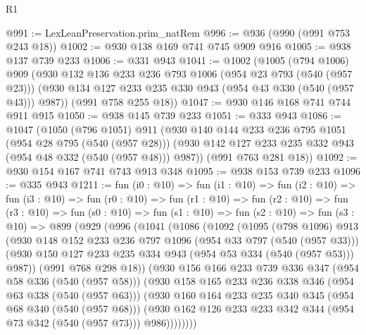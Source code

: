 \begin{lexlean}{R1}
\begin{coremodule}
@991 := LexLeanPreservation.prim_natRem
@996 := @936 (@990 (@991 @753 @243 @18))
@1002 := @930 @138 @169 @741 @745 @909 @916
@1005 := @938 @137 @739 @233
@1006 := @331 @943
@1041 := @1002
    (@1005
      (@794 @1006)
      @909
      (@930
        @132
        @136
        @233
        @236
        @793
        @1006
        (@954 @23 @793 (@540 (@957 @23)))
        (@930 @134 @127 @233 @235 @330 @943 (@954 @43 @330 (@540 (@957 @43))) @987))
      (@991 @758 @255 @18))
@1047 := @930 @146 @168 @741 @744 @911 @915
@1050 := @938 @145 @739 @233
@1051 := @333 @943
@1086 := @1047
    (@1050
      (@796 @1051)
      @911
      (@930
        @140
        @144
        @233
        @236
        @795
        @1051
        (@954 @28 @795 (@540 (@957 @28)))
        (@930 @142 @127 @233 @235 @332 @943 (@954 @48 @332 (@540 (@957 @48))) @987))
      (@991 @763 @281 @18))
@1092 := @930 @154 @167 @741 @743 @913 @348
@1095 := @938 @153 @739 @233
@1096 := @335 @943
@1211 := fun (i0 : @10) =>
  fun (i1 : @10) =>
  fun (i2 : @10) =>
  fun (i3 : @10) =>
  fun (r0 : @10) =>
  fun (r1 : @10) =>
  fun (r2 : @10) =>
  fun (r3 : @10) =>
  fun (s0 : @10) =>
  fun (s1 : @10) =>
  fun (s2 : @10) =>
  fun (s3 : @10) =>
  @899
    (@929
      (@996
        (@1041
          (@1086
            (@1092
              (@1095
                (@798 @1096)
                @913
                (@930
                  @148
                  @152
                  @233
                  @236
                  @797
                  @1096
                  (@954 @33 @797 (@540 (@957 @33)))
                  (@930 @150 @127 @233 @235 @334 @943 (@954 @53 @334 (@540 (@957 @53))) @987))
                (@991 @768 @298 @18))
              (@930
                @156
                @166
                @233
                @739
                @336
                @347
                (@954 @58 @336 (@540 (@957 @58)))
                (@930
                  @158
                  @165
                  @233
                  @236
                  @338
                  @346
                  (@954 @63 @338 (@540 (@957 @63)))
                  (@930
                    @160
                    @164
                    @233
                    @235
                    @340
                    @345
                    (@954 @68 @340 (@540 (@957 @68)))
                    (@930
                      @162
                      @126
                      @233
                      @233
                      @342
                      @344
                      (@954 @73 @342 (@540 (@957 @73)))
                      @986))))))))

\end{coremodule}
\end{lexlean}
